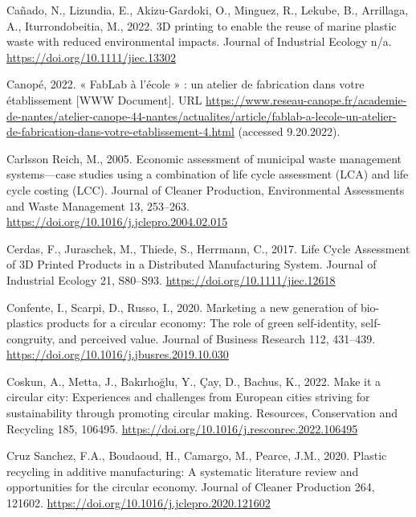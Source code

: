 \documentclass[12pt]{elsarticle} %
\newlength{\cslhangindent}
\newlength{\cslentryspacingunit} %
\newenvironment{CSLReferences}[2] %
 {%
  \setlength{\parindent}{0pt}
  \ifodd #1
  \let\oldpar\par
  \def\par{\hangindent=\cslhangindent\oldpar}
  \fi
  \setlength{\parskip}{#2\cslentryspacingunit}
 }%
 {}
\begin{document}
\begin{CSLReferences}{1}{0}
\leavevmode{}%
Cañado, N., Lizundia, E., Akizu-Gardoki, O., Minguez, R., Lekube, B., Arrillaga, A., Iturrondobeitia, M., 2022. {3D} printing to enable the reuse of marine plastic waste with reduced environmental impacts. Journal of Industrial Ecology n/a. \url{https://doi.org/10.1111/jiec.13302}

\leavevmode{}%
Canopé, 2022. « FabLab à l'école » : un atelier de fabrication dans votre établissement {[}WWW Document{]}. URL \url{https://www.reseau-canope.fr/academie-de-nantes/atelier-canope-44-nantes/actualites/article/fablab-a-lecole-un-atelier-de-fabrication-dans-votre-etablissement-4.html} (accessed 9.20.2022).

\leavevmode{}%
Carlsson Reich, M., 2005. Economic assessment of municipal waste management systems---case studies using a combination of life cycle assessment ({LCA}) and life cycle costing ({LCC}). Journal of Cleaner Production, Environmental {Assessments} and {Waste Management} 13, 253--263. \url{https://doi.org/10.1016/j.jclepro.2004.02.015}

\leavevmode{}%
Cerdas, F., Juraschek, M., Thiede, S., Herrmann, C., 2017. Life {Cycle Assessment} of {3D Printed Products} in a {Distributed Manufacturing System}. Journal of Industrial Ecology 21, S80--S93. \url{https://doi.org/10.1111/jiec.12618}

\leavevmode{}%
Confente, I., Scarpi, D., Russo, I., 2020. Marketing a new generation of bio-plastics products for a circular economy: {The} role of green self-identity, self-congruity, and perceived value. Journal of Business Research 112, 431--439. \url{https://doi.org/10.1016/j.jbusres.2019.10.030}

\leavevmode{}%
Coskun, A., Metta, J., Bakırlıoğlu, Y., Çay, D., Bachus, K., 2022. Make it a circular city: {Experiences} and challenges from {European} cities striving for sustainability through promoting circular making. Resources, Conservation and Recycling 185, 106495. \url{https://doi.org/10.1016/j.resconrec.2022.106495}

\leavevmode{}%
Cruz Sanchez, F.A., Boudaoud, H., Camargo, M., Pearce, J.M., 2020. Plastic recycling in additive manufacturing: {A} systematic literature review and opportunities for the circular economy. Journal of Cleaner Production 264, 121602. \url{https://doi.org/10.1016/j.jclepro.2020.121602}


\end{CSLReferences}
\end{document}
